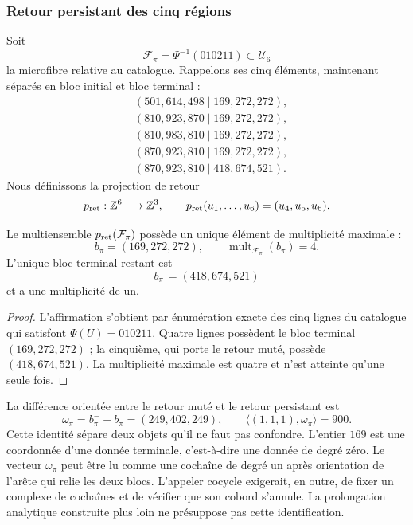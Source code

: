 \subsubsection{Retour persistant des cinq régions}

Soit
\[
\mathcal F_\pi=\Psi^{-1}(010211)\subset\mathcal U_6
\]
la microfibre relative au catalogue. Rappelons ses cinq éléments, maintenant séparés en bloc initial et bloc terminal :
\[
\begin{aligned}
 &(501,614,498\mid169,272,272),\\
 &(810,923,870\mid169,272,272),\\
 &(810,983,810\mid169,272,272),\\
 &(870,923,810\mid169,272,272),\\
 &(870,923,810\mid418,674,521).
\end{aligned}
\]
Nous définissons la projection de retour
\[
p_{\rm ret}:\mathbb Z^6\longrightarrow\mathbb Z^3,
\qquad
p_{\rm ret}(u_1,\ldots,u_6)=(u_4,u_5,u_6).
\]

\begin{proposition}
\label{p12-83-c13-s3:prop:bloque-terminal-persistente}
Le multiensemble \(p_{\rm ret}(\mathcal F_\pi)\) possède un unique élément de
multiplicité maximale :
\[
b_\pi=(169,272,272),
\qquad
\operatorname{mult}_{\mathcal F_\pi}(b_\pi)=4.
\]
L'unique bloc terminal restant est
\[
b_\pi^-=(418,674,521)
\]
et a une multiplicité de un.
\end{proposition}

\begin{proof}
L'affirmation s'obtient par énumération exacte des cinq lignes du catalogue qui satisfont \(\Psi(U)=010211\). Quatre lignes possèdent le bloc terminal \((169,272,272)\) ; la cinquième, qui porte le retour muté, possède \((418,674,521)\). La multiplicité maximale est quatre et n'est atteinte qu'une seule fois.
\end{proof}

La différence orientée entre le retour muté et le retour persistant est
\[
 \omega_\pi=b_\pi^- - b_\pi=(249,402,249),
 \qquad
 \langle(1,1,1),\omega_\pi\rangle=900.
\]
Cette identité sépare deux objets qu'il ne faut pas confondre. L'entier
\(169\) est une coordonnée d'une donnée terminale, c'est-à-dire une donnée de degré
zéro. Le vecteur \(\omega_\pi\) peut être lu comme une cochaîne de degré un
après orientation de l'arête qui relie les deux blocs. L'appeler cocycle exigerait,
en outre, de fixer un complexe de cochaînes et de vérifier que son cobord s'annule.
La prolongation analytique construite plus loin ne présuppose pas cette
identification.

